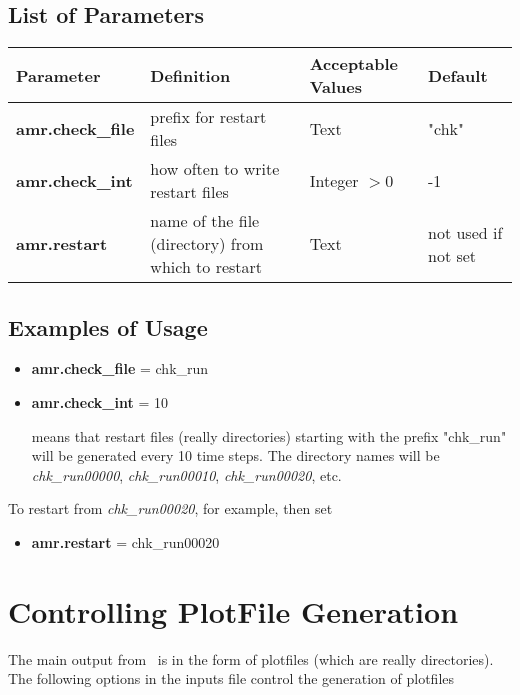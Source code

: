 \subsection{List of Parameters}

\begin{table*}[h]
\begin{scriptsize}
\begin{center}
\begin{tabular}{|l|l|l|l|} \hline
Parameter & Definition & Acceptable Values &Default\\
\hline
{\bf amr.check\_file} & prefix for restart files & Text & "chk" \\
{\bf amr.check\_int}  & how often to write restart files & Integer $> 0$ & -1  \\
{\bf amr.restart}     & name of the file (directory) from which to restart & Text & not used if not set \\
\hline
\end{tabular}
\end{center}
\end{scriptsize}
\end{table*}

\subsection{Examples of Usage}

\begin{itemize}

\item {\bf amr.check\_file} = chk\_run
\item {\bf amr.check\_int} = 10

means that restart files (really directories) starting with the prefix "chk\_run" will be
generated every 10 time steps.  The directory names will be {\it chk\_run00000}, 
{\it chk\_run00010}, {\it chk\_run00020}, etc.

\end{itemize}

To restart from {\it chk\_run00020}, for example, then set 

\begin{itemize}
\item {\bf amr.restart} = chk\_run00020
\end{itemize}

\section{Controlling PlotFile Generation}
\label{sec:PlotFiles}
The main output from \mfix\ is in the form of plotfiles (which are really directories).
The following options in the inputs file control the generation of plotfiles 

